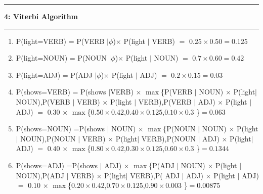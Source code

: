 \documentclass[11pt]{article}
\newcommand\question[2]{\vspace{.25in}\hrule\textbf{#1: #2}\vspace{.5em}\hrule\vspace{.10in}}
\begin{document}
\newpage
\question{4}{Viterbi Algorithm}

\begin{enumerate} \large

\item P(light=VERB) = P(VERB $\mid \phi$)$\times$ P(light $\mid$ VERB) $=$ $0.25 \times 0.50=0.125$   \\

\item P(light=NOUN) = P(NOUN $\mid \phi$)$\times$ P(light $\mid$ NOUN) $=$ $0.7 \times 0.60=0.42$  \\

\item P(light=ADJ) = P(ADJ $\mid \phi$)$\times$ P(light $\mid$ ADJ) $=$ $0.2 \times 0.15=0.03$  \\

\item P(shows=VERB) = P(shows $\mid $VERB) $\times$ $\max$\{P(VERB $\mid$ NOUN) $\times$ P(light$\mid$ NOUN),\thinspace P(VERB $\mid $ VERB) $\times$ P(light $ \mid $ VERB),\thinspace P(VERB $\mid $ ADJ) $\times$ P(light  $\mid $ ADJ) $=$ $0.30$ $\times$ $\max$\{$0.50 \times 0.42$,\thinspace $0.40 \times 0.125$,\thinspace$0.10 \times 0.3$ \}$=0.063$\\

\item P(shows=NOUN) =P(shows $\mid$ NOUN) $\times$ $\max$\{P(NOUN $\mid $ NOUN) $\times$ P(light$\mid$ NOUN),\thinspace P(NOUN $\mid$ VERB) $\times$ P(light$ \mid $ VERB),\thinspace P(NOUN $\mid$ ADJ) $\times$ P(light$ \mid $ADJ) $=$ $0.40$ $\times$ $\max$\{$0.80 \times 0.42$,\thinspace $0.30 \times 0.125$,\thinspace$0.60 \times 0.3$ \}$=0.1344$\\

\item P(shows=ADJ) =P(shows $\mid $ ADJ) $\times$ $\max$\{P(ADJ $\mid $ NOUN) $\times$ P(light $\mid $NOUN),\thinspace P(ADJ $\mid$ VERB) $\times$ P(light$ \mid$ VERB),\thinspace P( ADJ $\mid $ ADJ) $\times$ P(light $\mid$ ADJ) $=$ $0.10$ $\times$ $\max$\{$0.20 \times 0.42$,\thinspace $0.70 \times 0.125$,\thinspace$0.90 \times 0.003$ \}$=0.00875$ \\

\end{enumerate} 
\end{document}
